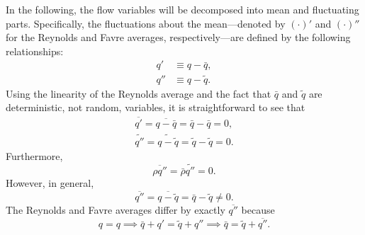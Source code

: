 \documentclass[letterpaper,11pt,nointlimits,reqno,draft]{amsbook}
\begin{document}
In the following, the flow variables will be decomposed into mean and
fluctuating parts.  Specifically, the fluctuations about the
mean---denoted by $(\cdot)'$ and $(\cdot)''$ for the Reynolds and
Favre averages, respectively---are defined by the following
relationships:
%
\begin{align*}
q' &\equiv q - \bar{q}, \\
q'' &\equiv q - \tilde{q}.
\end{align*}
%
Using the linearity of the Reynolds average and the fact that
$\bar{q}$ and $\tilde{q}$ are deterministic, not random, variables, it
is straightforward to see that
%
\begin{gather*}
\overline{q'} = \overline{q - \bar{q}} = \bar{q} - \bar{q} =  0, \\
\widetilde{q''} = \widetilde{q - \tilde{q}} = \tilde{q} - \tilde{q} = 0.
\end{gather*}
%
Furthermore,
%
\begin{equation*}
\overline{\rho q''} = \bar{\rho} \widetilde{q''} = 0.
\end{equation*}
%
However, in general,
%
\begin{equation*}
\overline{q''} = \overline{q - \tilde{q}} = \bar{q} - \tilde{q} \neq 0.
\end{equation*}
%
The Reynolds and Favre averages differ by exactly $\overline{q''}$ because
\begin{equation*}
q = q
\implies
\bar{q} + q' = \tilde{q} + q''
\implies
\bar{q} = \tilde{q} + \overline{q''}.
\end{equation*}
\end{document}
